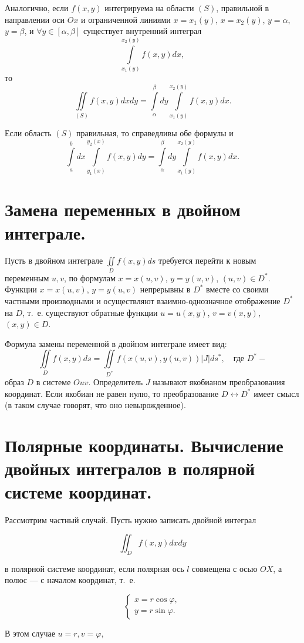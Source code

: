 \documentclass{article}
\begin{document}
Аналогично, если $f(x, y)$ интегрируема на области $(S)$, правильной в направлении оси $Ox$ и ограниченной линиями $x = x_1(y)$, $x = x_2(y)$, $y = \alpha$, $y = \beta$, и $\forall y \in [\alpha, \beta]$ существует внутренний интеграл
\[
  \int\limits_{x_1(y)}^{x_2(y)} f(x,y) dx,
\]
то
\[
  \iint\limits_{(S)} f(x,y) dxdy = \int\limits_{\alpha}^{\beta} dy \int\limits_{x_1(y)}^{x_2(y)} f(x,y) dx.
\]

Если область $(S)$ правильная, то справедливы обе формулы и
\[
  \int\limits_{a}^{b} dx \int\limits_{y_1(x)}^{y_2(x)} f(x,y) dy = \int\limits_{\alpha}^{\beta} dy \int\limits_{x_1(y)}^{x_2(y)} f(x,y) dx.
\]

\section{Замена переменных в двойном интеграле.}
Пусть в двойном интеграле \(\iint\limits_D f(x,y)ds\) требуется перейти к новым переменным \(u,v\),
по формулам \(x=x(u,v)\), \(y=y(u,v)\), \((u,v)\in D^*\). Функции \(x=x(u,v)\), \(y=y(u,v)\) непрерывны в \(D^*\)
вместе со своими частными производными и осуществляют взаимно-однозначное
отображение \(D^*\) на \(D\), т.~е. существуют обратные функции \(u=u(x,y)\), \(v=v(x,y)\), \((x,y)\in D\).

Формула замены переменной в двойном интеграле имеет вид:
\[
  \iint\limits_D f(x,y)ds = \iint\limits_{D^*} f(x(u,v),y(u,v))|J|ds^*, \quad \text{где } D^* -
\]
образ \(D\) в системе \(Ouv\). Определитель \(J\) называют якобианом преобразования
координат. Если якобиан не равен нулю, то преобразование \(D \leftrightarrow D^*\) имеет смысл (в таком
случае говорят, что оно невырожденное).
\section{Полярные координаты. Вычисление двойных интегралов в полярной системе координат.}
Рассмотрим частный случай. Пусть нужно записать двойной интеграл

\[
  \iint_D f(x, y) dxdy
\]

в полярной системе координат, если полярная ось \( l \) совмещена с осью \( OX \), а полюс --- с началом координат, т.~е.

\[
  \begin{cases}
    x = r\cos\varphi, \\
    y = r\sin\varphi.
  \end{cases}
\]

В этом случае \( u=r, v=\varphi \),
\end{document}
